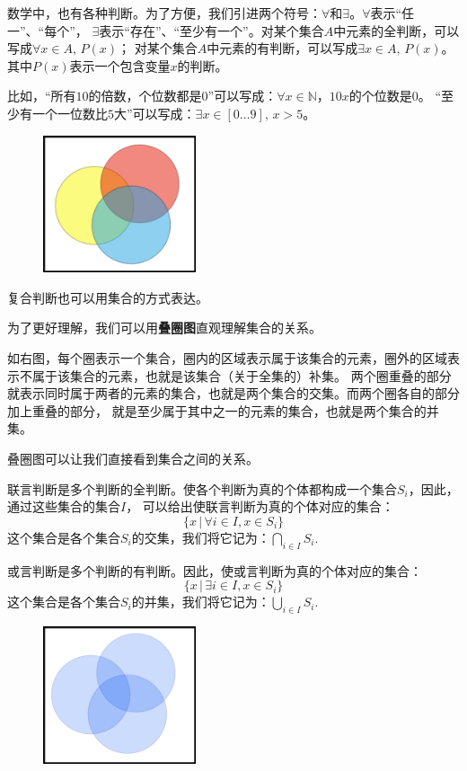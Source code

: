 \documentclass[12pt,UTF8]{ctexbook}
\begin{document}
数学中，也有各种判断。为了方便，我们引进两个符号：$\forall$和$\exists$。$\forall$表示“任一”、“每个”，
$\exists$表示“存在”、“至少有一个”。对某个集合$A$中元素的全判断，可以写成$\forall x \in A, \, P(x)$；
对某个集合$A$中元素的有判断，可以写成$\exists x \in A, \, P(x)$。其中$P(x)$表示一个包含变量$x$的判断。

比如，“所有$10$的倍数，个位数都是$0$”可以写成：$\forall x \in \mathbb{N}$，$ 10 x$的个位数是$0$。
“至少有一个一位数比$5$大”可以写成：$\exists x \in [0\ldots 9], \, x > 5$。

\begin{figure} %
    \vspace{-34pt}
    \flushright
    \includegraphics[width=0.4\textwidth]{叠圈图0.png}
\end{figure}

复合判断也可以用集合的方式表达。

为了更好理解，我们可以用\textbf{叠圈图}直观理解集合的关系。

如右图，每个圈表示一个集合，圈内的区域表示属于该集合的元素，圈外的区域表示不属于该集合的元素，也就是该集合（关于全集的）补集。
两个圈重叠的部分就表示同时属于两者的元素的集合，也就是两个集合的交集。而两个圈各自的部分加上重叠的部分，
就是至少属于其中之一的元素的集合，也就是两个集合的并集。

叠圈图可以让我们直接看到集合之间的关系。

联言判断是多个判断的全判断。使各个判断为真的个体都构成一个集合$S_i$，因此，通过这些集合的集合$I$，
可以给出使联言判断为真的个体对应的集合：
$$ \{x \,| \,\forall i \in I, x \in S_i \} $$
这个集合是各个集合$S_i$的交集，我们将它记为：$ \bigcap_{i\in I} S_i. $

或言判断是多个判断的有判断。因此，使或言判断为真的个体对应的集合：
$$ \{x \,|\, \exists i \in I, x \in S_i \} $$
这个集合是各个集合$S_i$的并集，我们将它记为：$ \bigcup_{i\in I} S_i. $

\begin{figure} %
    \vspace{-28pt}
    \flushright
    \includegraphics[width=0.4\textwidth]{叠圈图1.png}
\end{figure}
\end{document}
